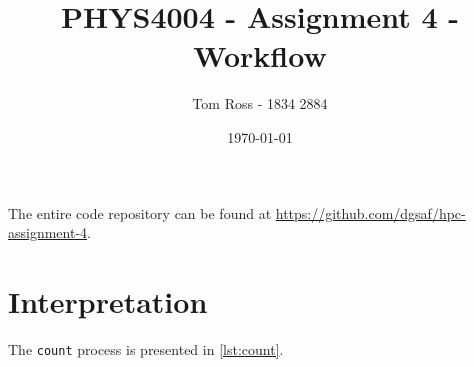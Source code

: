 \documentclass{article}
\title{PHYS4004 - Assignment 4 - Workflow}
\author{Tom Ross - 1834 2884}
\date{\today}
\begin{document}
The entire code repository can be found at
\url{https://github.com/dgsaf/hpc-assignment-4}.

\tableofcontents

\listoffigures

\listoftables

\clearpage

\section{Interpretation}
\label{sec:interpretation}

The \lstinline{count} process is presented in \autoref{lst:count}.


\end{document}
